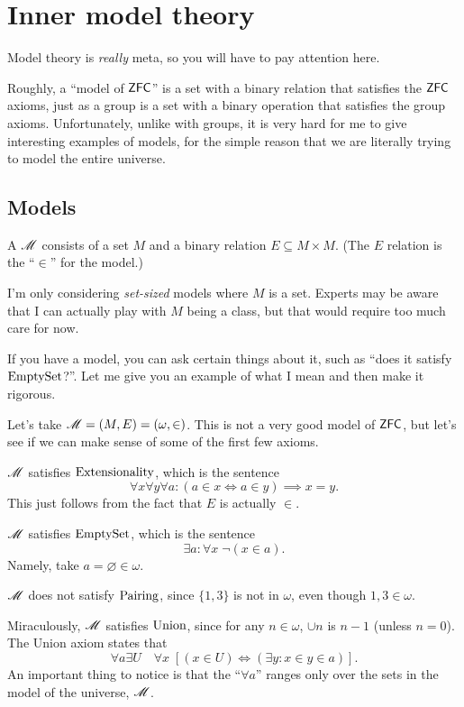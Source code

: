 \chapter{Inner model theory}
Model theory is \emph{really} meta, so you will have to pay attention here.

Roughly, a ``model of $\mathsf{ZFC}$'' is a set with a binary relation that satisfies the $\mathsf{ZFC}$ axioms,
just as a group is a set with a binary operation that satisfies the group axioms.
Unfortunately, unlike with groups, it is very hard for me to give interesting examples of models,
for the simple reason that we are literally trying to model the entire universe.

\section{Models}
\begin{definition}
	A  $\mathscr M$ consists of a set $M$ and a
	binary relation $E \subseteq M \times M$.
	(The $E$ relation is the ``$\in$'' for the model.)
\end{definition}
\begin{remark}
	I'm only considering \emph{set-sized} models where $M$ is a set.
	Experts may be aware that I can actually play with $M$ being a class,
	but that would require too much care for now.
\end{remark}
If you have a model, you can ask certain things about it,
such as ``does it satisfy $\mathrm{EmptySet}$?''.
Let me give you an example of what I mean and then make it rigorous.
\begin{example}
	Let's take $\mathscr M = (M,E) = \left( \omega, \in \right)$.
	This is not a very good model of $\mathsf{ZFC}$, but let's see if we can
	make sense of some of the first few axioms.
	\begin{enumerate}[(a)]
		\ii $\mathscr M$ satisfies $\mathrm{Extensionality}$, which is the sentence
		\[ \forall x \forall y \forall a :
			\left( a \in x \iff a \in y \right) \implies x = y. \]
		This just follows from the fact that $E$ is actually $\in$.

		\ii $\mathscr M$ satisfies $\mathrm{EmptySet}$, which is the sentence
		\[ \exists a : \forall x \; \neg (x \in a). \]
		Namely, take $a = \varnothing \in \omega$.

		\ii $\mathscr M$ does not satisfy $\mathrm{Pairing}$, since $\{1,3\}$ is not in $\omega$,
		even though $1, 3 \in \omega$.

		\ii Miraculously, $\mathscr M$ satisfies $\mathrm{Union}$, since for any $n \in \omega$,
		$\cup n$ is $n-1$ (unless $n=0$).
		The Union axiom states that
		\[ \forall a \exists U \quad \forall x \;
		\left[ (x \in U) \iff (\exists y : x \in y \in a) \right]. \]
		An important thing to notice is that the ``$\forall a$'' ranges only over
		the sets in the model of the universe, $\mathscr M$.
	\end{enumerate}
\end{example}
